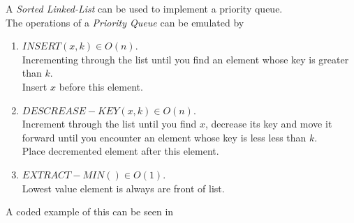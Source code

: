 \documentclass[11pt,a4paper]{article}
\begin{document}
A \textit{Sorted Linked-List} can be used to implement a priority queue.\\
The operations of a \textit{Priority Queue} can be emulated by
\begin{enumerate}[label=\roman*)]
  \item $INSERT(x,k)\in O(n)$.\\
  Incrementing through the list until you find an element whose key is greater than $k$.\\
  Insert $x$ before this element.
  \item $DESCREASE-KEY(x,k) \in O(n)$.\\
  Increment through the list until you find $x$, decrease its key and move it forward until you encounter an element whose key is less less than $k$.\\
  Place decremented element after this element.
  \item $EXTRACT-MIN()\in O(1)$.\\
  Lowest value element is always are front of list.
\end{enumerate}
\nb A coded example of this can be seen in {}\\
\end{document}
